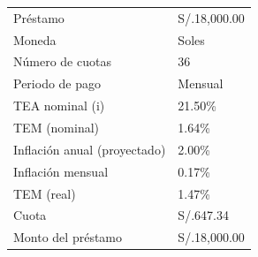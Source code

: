 \documentclass[a4paper,openright,12pt]{book}
\begin{document}
\begin{table}[H]
\begin{tabular}{ll}
Préstamo                     & S/.18,000.00 \\
\rowcolor[HTML]{F2F2F2} 
Moneda                       & Soles        \\
Número de cuotas             & 36           \\
\rowcolor[HTML]{F2F2F2} 
Periodo de pago              & Mensual      \\
TEA nominal (i)              & 21.50\%      \\
\rowcolor[HTML]{F2F2F2} 
TEM (nominal)                & 1.64\%       \\
Inflación anual (proyectado) & 2.00\%       \\
\rowcolor[HTML]{F2F2F2} 
Inflación mensual            & 0.17\%       \\
TEM (real)                   & 1.47\%       \\
\rowcolor[HTML]{F2F2F2} 
Cuota                        & S/.647.34    \\
Monto del préstamo           & S/.18,000.00
\end{tabular}
\end{table}
\end{document}
